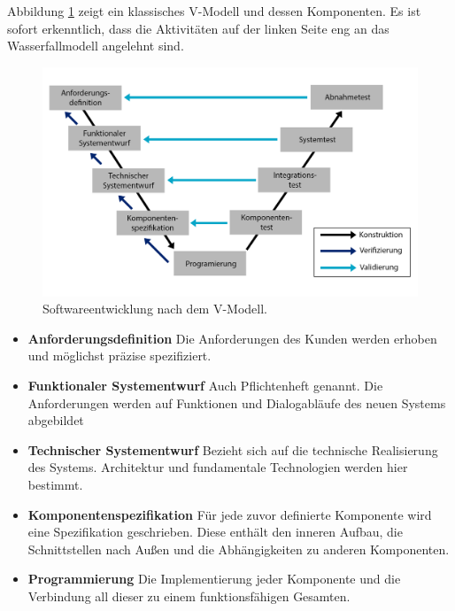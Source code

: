 Abbildung \ref{fig:v_modell} zeigt ein klassisches V-Modell und dessen Komponenten. Es ist sofort erkenntlich, dass die Aktivitäten auf der linken Seite eng an das Wasserfallmodell\cite{grechenig_softwaretechnik:_2010} angelehnt sind.

\begin{figure}[h] 
  \centering
     \includegraphics[width=1\textwidth]{figures/v_modell.png}
  \caption{Softwareentwicklung nach dem V-Modell.}
  \label{fig:v_modell}
\end{figure}



\begin{itemize}
\item \textbf{Anforderungsdefinition} Die Anforderungen des Kunden werden erhoben und möglichst präzise spezifiziert.
\item \textbf{Funktionaler Systementwurf} Auch Pflichtenheft genannt. Die Anforderungen werden auf Funktionen und Dialogabläufe des neuen Systems abgebildet\cite{spillner_basiswissen_2012}
\item \textbf{Technischer Systementwurf} Bezieht sich auf die technische Realisierung des Systems. Architektur und fundamentale Technologien werden hier bestimmt.
\item \textbf{Komponentenspezifikation} Für jede zuvor definierte Komponente wird eine Spezifikation geschrieben. Diese enthält den inneren Aufbau, die Schnittstellen nach Außen und die Abhängigkeiten zu anderen Komponenten.
\item \textbf{Programmierung} Die Implementierung jeder Komponente und die Verbindung all dieser zu einem funktionsfähigen Gesamten.
\end{itemize}

